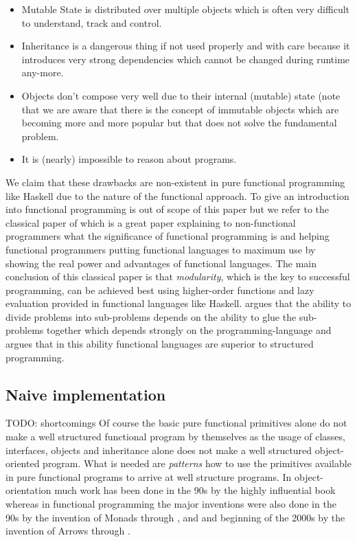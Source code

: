 \begin{itemize}
\item Mutable State is distributed over multiple objects which is often very difficult to understand, track and control.
\item Inheritance is a dangerous thing if not used properly and with care because it introduces very strong dependencies which cannot be changed during runtime any-more.
\item Objects don't compose very well due to their internal (mutable) state (note that we are aware that there is the concept of immutable objects which are becoming more and more popular but that does not solve the fundamental problem.
\item It is (nearly) impossible to reason about programs.
\end{itemize}

We claim that these drawbacks are non-existent in pure functional programming like Haskell due to the nature of the functional approach. To give an introduction into functional programming is out of scope of this paper but we refer to the classical paper of \cite{hughes_why_1989} which is a great paper explaining to non-functional programmers what the significance of functional programming is and helping functional programmers putting functional languages to maximum use by showing the real power and advantages of functional languages. The main conclusion of this classical paper is that \textit{modularity}, which is the key to successful programming, can be achieved best using higher-order functions and lazy evaluation provided in functional languages like Haskell. \cite{hughes_why_1989} argues that the ability to divide problems into sub-problems depends on the ability to glue the sub-problems together which depends strongly on the programming-language and \cite{hughes_why_1989} argues that in this ability functional languages are superior to structured programming.

\subsection{Naive implementation}
TODO: shortcomings
Of course the basic pure functional primitives alone do not make a well structured functional program by themselves as the usage of classes, interfaces, objects and inheritance alone does not make a well structured object-oriented program. What is needed are \textit{patterns} how to use the primitives available in pure functional programs to arrive at well structure programs. In object-orientation much work has been done in the 90s by the highly influential book \cite{gamma_design_1994} whereas in functional programming the major inventions were also done in the 90s by the invention of Monads through \cite{Moggi1989}, \cite{Wadler1990} and \cite{Wadler1995} and beginning of the 2000s by the invention of Arrows through \cite{Hughes2000}.

